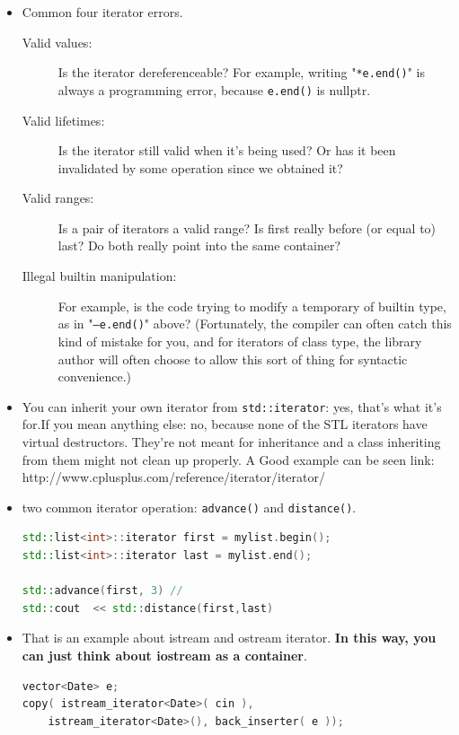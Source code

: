 \documentclass[a4paper,11pt,twoside]{book}
\begin{document}
\begin{itemize}
\item Common four iterator errors.
\begin{description}



\item [Valid values:] Is the iterator dereferenceable? For example, writing "\texttt{*e.end()}" is always a programming error, because \texttt{e.end()} is nullptr.

\item [Valid lifetimes:] Is the iterator still valid when it's being used? Or has it been invalidated by some operation since we obtained it?

\item [Valid ranges:] Is a pair of iterators a valid range? Is first really before (or equal to) last? Do both really point into the same container?

\item [Illegal builtin manipulation:] For example, is the code trying to modify a temporary of builtin type, as in "\texttt{--e.end()}" above? (Fortunately, the compiler can often catch this kind of mistake for you, and for iterators of class type, the library author will often choose to allow this sort of thing for syntactic convenience.)

\end{description}


\item You can inherit your own iterator from \texttt{std::iterator}: yes, that's what it's for.If you mean anything else: no, because none of the STL iterators have virtual destructors. They're not meant for inheritance and a class inheriting from them might not clean up properly. A Good example can be seen link: \\ http://www.cplusplus.com/reference/iterator/iterator/

\item two common iterator operation:  \texttt{advance()} and \texttt{distance()}.
\begin{lstlisting}[frame=single, language=c++]
std::list<int>::iterator first = mylist.begin();
std::list<int>::iterator last = mylist.end();

std::advance(first, 3) //
std::cout  << std::distance(first,last)
\end{lstlisting}


\item That is an example about istream and ostream iterator. \textbf{In this way, you can just think about iostream as a container}.
\begin{lstlisting}[frame=single, language=c++]
vector<Date> e;
copy( istream_iterator<Date>( cin ), 
	istream_iterator<Date>(), back_inserter( e ));


\end{lstlisting}
\end{itemize}
\end{document}
